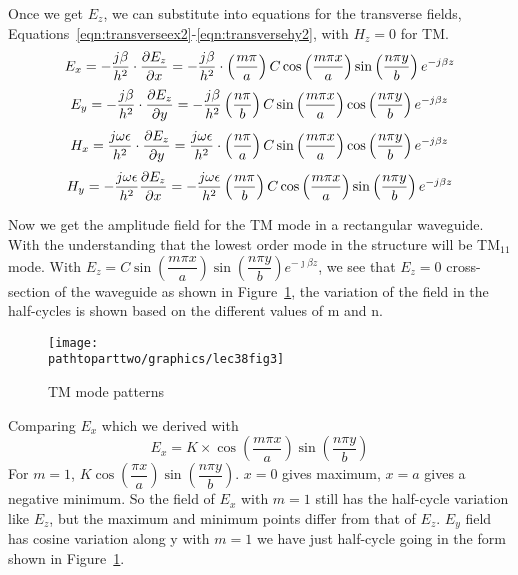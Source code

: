 Once we get $E_z$, we can substitute into equations for the transverse fields, Equations~\eqref{eqn:transverseex2}-\eqref{eqn:transversehy2}, with $H_{z} = 0$ for TM.
\begin{dmath*}
E_x = -\frac{j \beta}{h^2}\cdot\pdv{E_{z}}{x} = -\frac{j \beta}{h^{2}}\cdot\left(\frac{m\pi}{a}\right) C\cos \left(\frac{m\pi x}{a}\right)\sin \left(\frac{n\pi y}{b}\right)e^{-j \beta z}
\end{dmath*}
\begin{dmath*}
E_y = -\frac{j \beta}{h^2}\cdot \pdv{E_z}{y} = -\frac{j \beta}{h^{2}}\left(\frac{n\pi}{b}\right) C \sin\left(\frac{m\pi x}{a}\right)\cos \left(\frac{n\pi y}{b}\right)e^{-j \beta z}
\end{dmath*}
\begin{dmath*}
H_x = \frac{j \omega\epsilon}{h^2}\cdot\pdv{E_z}{y} = \frac{j \omega\epsilon}{h^{2}}\cdot\left(\frac{n\pi}{a}\right) C \sin \left(\frac{m\pi x}{a}\right)\cos \left(\frac{n\pi y}{b}\right)e^{-j \beta z}
\end{dmath*}
\begin{dmath*}
H_y =-\frac{j \omega\epsilon}{h^2}\pdv{E_z}{x} = -\frac{j \omega\epsilon}{h^{2}}\left(\frac{m\pi}{b}\right) C \cos \left(\frac{m\pi x}{a}\right)\sin \left(\frac{n\pi y}{b}\right)e^{-j \beta z}
\end{dmath*}

Now we get the amplitude field for the TM mode in a rectangular waveguide. With the understanding that the lowest order mode in the structure will be TM$_{11}$ mode. With $E_z = C\sin\left(\dfrac{m\pi x}{a}\right)\sin\left(\dfrac{n\pi y}{b}\right)e^{-\jmath\beta z}$, we see that $E_z = 0$ cross-section of the waveguide as shown in Figure~\ref{fig:lec38fig3}, the variation of the field in the half-cycles is shown based on the different values of m and n.
\begin{figure}[h]
\centering
\texttt{[image: \\pathtoparttwo/graphics/lec38fig3]}
\caption{TM mode patterns}
\label{fig:lec38fig3}
\end{figure}
Comparing $E_x$ which we derived with 
\begin{dmath*}
E_x = K \times \cos\left(\frac{m\pi x}{a}\right)\sin\left(\frac{n\pi y}{b}\right)
\end{dmath*}
For $m=1$, $K\cos\left(\dfrac{\pi x}{a}\right)\sin\left(\dfrac{n\pi y}{b}\right)$. $x=0$ gives maximum, $x=a$ gives a negative minimum. So the field of $E_x$ with $m=1$ still has the half-cycle variation like $E_z$, but the maximum and minimum points differ from that of $E_z$. $E_y$ field has cosine variation along y with $m=1$ we have just half-cycle going in the form shown in Figure~\ref{fig:lec38fig3}.

